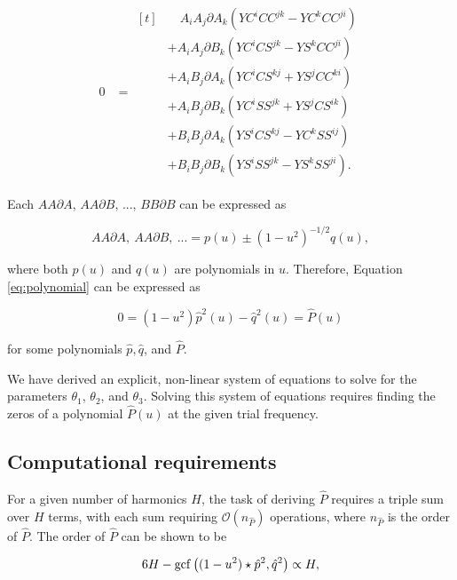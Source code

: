 \documentclass[iop]{emulateapj}
\newcommand{\bigO}{\mathcal{O}}
\newcommand{\dA}{\partial A}
\newcommand{\dB}{\partial B}
\begin{document}
\begin{align}\label{eq:polynomial}
0 &= 
\begin{aligned}[t]
&\quad A_iA_j\dA_k\left(YC^iCC^{jk} -  YC^kCC^{ji}\right)\\
&+ A_iA_j\dB_k\left(YC^iCS^{jk} - YS^kCC^{ji}\right)\\
&+ A_iB_j\dA_k\left(YC^iCS^{kj} + YS^jCC^{ki}\right)\\
&+ A_iB_j\dB_k\left(YC^iSS^{jk} + YS^jCS^{ik}\right)\\
&+ B_iB_j\dA_k\left(YS^iCS^{kj} - YC^kSS^{ij}\right)\\
&+ B_iB_j\dB_k\left(YS^iSS^{jk} - YS^kSS^{ji}\right).
\end{aligned}
\end{align}

Each $AA\dA$, $AA\dB$, ..., $BB\dB$ can be expressed as 

\begin{equation}
AA\dA,~AA\dB,~...= p(u) \pm (1 - u^2)^{-1/2}q(u),
\end{equation}

\noindent where both $p(u)$ and $q(u)$ are polynomials in $u$. Therefore, Equation
\ref{eq:polynomial} can be expressed as

\begin{equation}
0 = (1 - u^2)\hat{p}^2(u) - \hat{q}^2(u) = \hat{P}(u)
\end{equation}

\noindent for some polynomials $\hat{p}, \hat{q}$, and $\hat{P}$.


We have derived an explicit, non-linear system of equations to solve for
the parameters $\theta_1$, $\theta_2$, and $\theta_3$. Solving this system of equations
requires finding the zeros of a polynomial $\hat{P}(u)$ at the given trial frequency.

\subsection{Computational requirements}

For a given number of harmonics $H$, the task of deriving 
$\hat{P}$ requires a triple sum over $H$ terms, with each sum
requiring $\bigO(n_{\hat{P}})$ operations, where $n_{\hat{P}}$ is the order
of $\hat{P}$. The order of $\hat{P}$ can be shown to be

\begin{equation}
6H - {\rm gcf}\left((1 - u^2)\star\hat{p}^2, \hat{q}^2\right) \propto H,
\end{equation}
\end{document}
